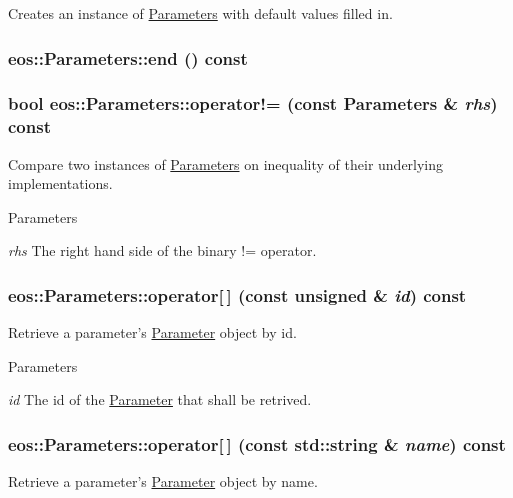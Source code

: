 Creates an instance of \hyperlink{classeos_1_1Parameters}{Parameters} with default values filled in. \hypertarget{classeos_1_1Parameters_a64f0ae769980d0945433023678f919dd}{
\subsubsection[{end}]{ eos::Parameters::end () const}}
\label{classeos_1_1Parameters_a64f0ae769980d0945433023678f919dd}
\hypertarget{classeos_1_1Parameters_a95091e66b113b826bc5866c52ecdb7c1}{
\subsubsection[{operator!=}]{\setlength{\rightskip}{0pt plus 5cm}bool eos::Parameters::operator!= (const {\bf Parameters} \& {\em rhs}) const}}
\label{classeos_1_1Parameters_a95091e66b113b826bc5866c52ecdb7c1}
Compare two instances of \hyperlink{classeos_1_1Parameters}{Parameters} on inequality of their underlying implementations.


\begin{DoxyParams}{Parameters}
\item[{\em rhs}]The right hand side of the binary != operator. \end{DoxyParams}
\hypertarget{classeos_1_1Parameters_ac320b54cad22e7c4eb4b3821ab409fb9}{
\subsubsection[{operator[]}]{ eos::Parameters::operator\mbox{[}$\,$\mbox{]} (const unsigned \& {\em id}) const}}
\label{classeos_1_1Parameters_ac320b54cad22e7c4eb4b3821ab409fb9}
Retrieve a parameter's \hyperlink{classeos_1_1Parameter}{Parameter} object by id.


\begin{DoxyParams}{Parameters}
\item[{\em id}]The id of the \hyperlink{classeos_1_1Parameter}{Parameter} that shall be retrived. \end{DoxyParams}
\hypertarget{classeos_1_1Parameters_acf41f953495892d14e4c49e248c60f43}{
\subsubsection[{operator[]}]{ eos::Parameters::operator\mbox{[}$\,$\mbox{]} (const std::string \& {\em name}) const}}
\label{classeos_1_1Parameters_acf41f953495892d14e4c49e248c60f43}
Retrieve a parameter's \hyperlink{classeos_1_1Parameter}{Parameter} object by name.


